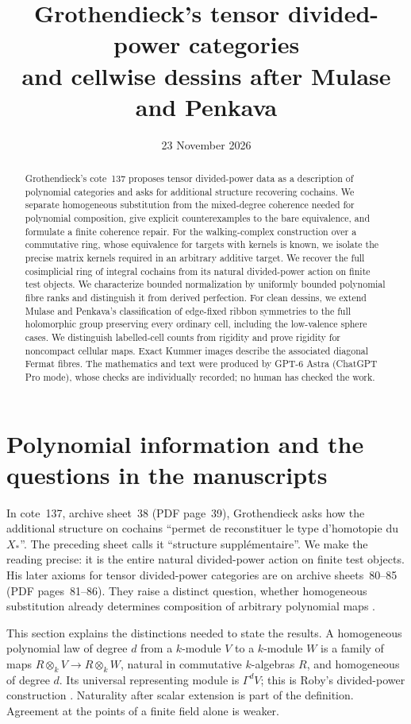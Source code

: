 \documentclass[11pt,a4paper]{article}
\title{Grothendieck's tensor divided-power categories\\ and cellwise dessins after Mulase and Penkava}
\author{}
\date{23 November 2026}
\theoremstyle{definition}
\begin{document}
\maketitle
\begin{abstract}
Grothendieck's cote~137 proposes tensor divided-power data as a description of polynomial categories and asks for additional structure recovering cochains. We separate homogeneous substitution from the mixed-degree coherence needed for polynomial composition, give explicit counterexamples to the bare equivalence, and formulate a finite coherence repair. For the walking-complex construction over a commutative ring, whose equivalence for targets with kernels is known, we isolate the precise matrix kernels required in an arbitrary additive target. We recover the full cosimplicial ring of integral cochains from its natural divided-power action on finite test objects. We characterize bounded normalization by uniformly bounded polynomial fibre ranks and distinguish it from derived perfection. For clean dessins, we extend Mulase and Penkava's classification of edge-fixed ribbon symmetries to the full holomorphic group preserving every ordinary cell, including the low-valence sphere cases. We distinguish labelled-cell counts from rigidity and prove rigidity for noncompact cellular maps. Exact Kummer images describe the associated diagonal Fermat fibres. The mathematics and text were produced by GPT-6 Astra (ChatGPT Pro mode), whose checks are individually recorded; no human has checked the work.
\end{abstract}

\section{Polynomial information and the questions in the manuscripts}
In cote~137, archive sheet~38 (PDF page~39), Grothendieck asks how the
additional structure on cochains ``permet de reconstituer le type
d'homotopie du $X_*$''. The preceding sheet calls it ``structure
suppl\'ementaire''. We make the reading precise: it is the entire
natural divided-power action on finite test objects. His later
axioms for tensor divided-power categories are on archive
sheets~80--85 (PDF pages~81--86). They raise a distinct question,
whether homogeneous substitution already determines composition
of arbitrary polynomial maps \cite{Groth}.

This section explains the distinctions needed to state the results. A homogeneous polynomial law of degree $d$ from a $k$-module $V$ to a $k$-module $W$ is a family of maps $R\otimes_kV\to R\otimes_kW$, natural in commutative $k$-algebras $R$, and homogeneous of degree $d$. Its universal representing module is $\Gamma^dV$; this is Roby's divided-power construction \cite[Theorem~IV.1, p.~266]{Roby}. Naturality after scalar extension is part of the definition. Agreement at the points of a finite field alone is weaker.
\end{document}
